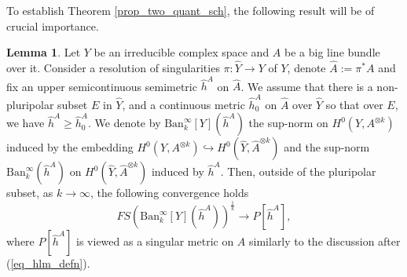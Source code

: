 \documentclass[12pt]{article}
\numberwithin{equation}{section}
\theoremstyle{theorem}
\theoremstyle{definition}
\newtheorem{lem}[thm]{Lemma}
\theoremstyle{remark}
\begin{document}
	To establish Theorem \ref{prop_two_quant_sch}, the following result will be of crucial importance. 
	\begin{lem}\label{lem_sup_y_hat}
		Let $Y$ be an irreducible complex space and $A$ be a big line bundle over it.
		Consider a resolution of singularities $\pi: \widehat{Y} \to Y$ of $Y$, denote $\widehat{A} := \pi^* A$ and fix an upper semicontinuous semimetric $\widehat{h}^A$ on $\widehat{A}$.
		We assume that there is a non-pluripolar subset $E$ in $\widehat{Y}$, and a continuous metric $\widehat{h}^A_0$ on $\widehat{A}$ over $\widehat{Y}$ so that over $E$, we have $\widehat{h}^A \geq \widehat{h}^A_0$.
		We denote by ${\textrm{Ban}}_k^{\infty}[Y](\widehat{h}^A)$ the sup-norm on $H^0(Y, A^{\otimes k})$ induced by the embedding $H^0(Y, A^{\otimes k}) \hookrightarrow H^0(\widehat{Y}, \widehat{A}^{\otimes k})$ and the sup-norm ${\textrm{Ban}}_k^{\infty}(\widehat{h}^A)$ on $H^0(\widehat{Y}, \widehat{A}^{\otimes k})$ induced by $\widehat{h}^A$.
		Then, outside of the pluripolar subset, as $k \to \infty$, the following convergence holds
		\begin{equation}
			FS({\textrm{Ban}}_k^{\infty}[Y](\widehat{h}^A))^{\frac{1}{k}}
			\to
			P[\widehat{h}^A],
		\end{equation}
		where $P[\widehat{h}^A]$ is viewed as a singular metric on $A$ similarly to the discussion after (\ref{eq_hlm_defn}).
	\end{lem}
\end{document}
